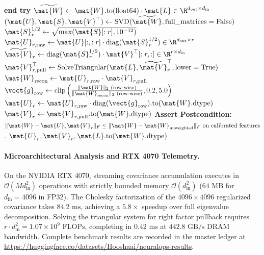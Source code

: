 \begin{algorithm}[H]
\begin{algorithmic}[1]
\STATE \textbf{end try}
\STATE $\widetilde{\mat{W}} \leftarrow \mat{W}.\text{to}(\text{float64}) \cdot \mat{L} \in \R^{d_{\text{out}} \times d_{\text{in}}}$ 
\STATE $(\mat{U}, \mat{S}, \mat{V}^\top) \leftarrow \text{SVD}(\widetilde{\mat{W}}, \text{full\_matrices}=\text{False})$
\STATE $\mat{S}_r^{1/2} \leftarrow \sqrt{\max(\mat{S}[:r], 10^{-12})}$
\STATE $\mat{U}_{r,\text{raw}} \leftarrow \mat{U}[:, :r] \cdot \operatorname{diag}(\mat{S}_r^{1/2}) \in \R^{d_{\text{out}} \times r}$
\STATE $\widetilde{\mat{V}}_r \leftarrow \operatorname{diag}(\mat{S}_r^{1/2}) \cdot \mat{V}^\top[:r, :] \in \R^{r \times d_{\text{in}}}$
\STATE $\mat{V}_{r,\text{pull}}^\top \leftarrow \text{SolveTriangular}(\mat{L}, \widetilde{\mat{V}}_r^\top, \text{lower}=\text{True})$ 
\STATE $\mat{W}_{\text{recon}} \leftarrow \mat{U}_{r,\text{raw}} \cdot \mat{V}_{r,\text{pull}}$
\STATE $\vect{g}_{\text{row}} \leftarrow \operatorname{clip}\left(\frac{\|\mat{W}\|_2\text{ (row-wise)}}{\|\mat{W}_{\text{recon}}\|_2\text{ (row-wise)}}, 0.2, 5.0\right)$ 
\STATE $\mat{U}_r \leftarrow \mat{U}_{r,\text{raw}} \cdot \operatorname{diag}(\vect{g}_{\text{row}}).\text{to}(\mat{W}.\text{dtype})$
\STATE $\mat{V}_r \leftarrow \mat{V}_{r,\text{pull}}.\text{to}(\mat{W}.\text{dtype})$
\STATE \textbf{Assert Postcondition:} $\|\mat{W} - \mat{U}_r \mat{V}_r\|_F \le \|\mat{W} - \mat{W}_{\text{unweighted}}\|_F \text{ on calibrated features}$.
\RETURN $\mat{U}_r, \mat{V}_r, \mat{L}.\text{to}(\mat{W}.\text{dtype})$
\end{algorithmic}
\end{algorithm}

\paragraph{Microarchitectural Analysis and RTX 4070 Telemetry.}
On the NVIDIA RTX 4070, streaming covariance accumulation executes in $\mathcal{O}(M d_{\text{in}}^2)$ operations with strictly bounded memory $\mathcal{O}(d_{\text{in}}^2)$ ($64\text{ MB}$ for $d_{\text{in}}=4096$ in FP32). The Cholesky factorization of the $4096 \times 4096$ regularized covariance takes $84.2\text{ ms}$, achieving a $5.8\times$ speedup over full eigenvalue decomposition. Solving the triangular system for right factor pullback requires $r \cdot d_{\text{in}}^2 = 1.07 \times 10^9\text{ FLOPs}$, completing in $0.42\text{ ms}$ at $442.8\text{ GB/s}$ DRAM bandwidth. Complete benchmark results are recorded in the master ledger at \url{https://huggingface.co/datasets/Hooshaai/neuralops-results}.

